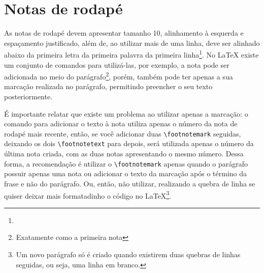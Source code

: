 \section{Notas de rodapé}
  As notas de rodapé devem apresentar tamanho 10, alinhamento à esquerda e espaçamento justificado, além de, ao utilizar mais de uma linha, deve ser alinhado abaixo da primeira letra da primeira palavra da primeira linha\footnote{\lipsum*[5]}. No \LaTeX{} existe um conjunto de comandos para utilizá-las, por exemplo, a nota pode ser adicionada no meio do parágrafo\footnote{Exatamente como a primeira nota}, porém, também pode ter apenas a sua marcação realizada no parágrafo\footnotemark, permitindo preencher o seu texto posteriormente.
  
  É importante relatar que existe um problema ao utilizar apenas a marcação: o comando para adicionar o texto à nota utiliza apenas o número da nota de rodapé mais recente\footnotemark, então, se você adicionar duas \verb|\footnotemark| seguidas\footnotemark, deixando os dois \verb|\footnotetext| para depois, será utilizada apenas o número da última nota criada, com as duas notas apresentando o mesmo número. 
  Dessa forma, a recomendação é utilizar o \verb|\footnotemark| apenas quando o parágrafo possuir apenas uma nota ou adicionar o texto da marcação após o término da frase e não do parágrafo. Ou, então, não utilizar, realizando a quebra de linha se quiser deixar mais formatadinho o código no \LaTeX\footnote{Um novo parágrafo só é criado quando existirem duas quebras de linhas seguidas, ou seja, uma linha em branco.}.

